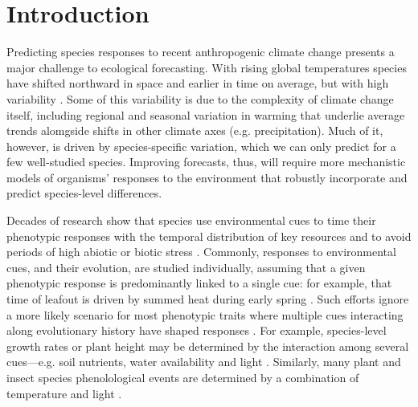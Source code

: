 \documentclass{article}\usepackage[]{graphicx}\usepackage[]{color}
\begin{document}
\section*{Introduction}
Predicting species responses to recent anthropogenic climate change presents a major challenge to ecological forecasting. With rising global temperatures species have shifted northward in space and earlier in time on average, but with high variability \citep{IPCC:2014sm}. Some of this variability is due to the complexity of climate change itself, including regional and seasonal variation in warming that underlie average trends alomgside shifts in other climate axes (e.g. precipitation). Much of it, however, is driven by species-specific variation, which we can only predict for a few well-studied species. Improving forecasts, thus, will require more mechanistic models of organisms' responses to the environment that robustly incorporate and predict species-level differences. %

Decades of research show that species use environmental cues to time their phenotypic responses with the temporal distribution of key resources and to avoid periods of high abiotic or biotic stress \citep{larcher1980,bonamour2019}. Commonly, responses to environmental cues, and their evolution, are studied individually, assuming that a given phenotypic response is predominantly linked to a single cue: for example, that time of leafout is driven by summed heat during early spring \citep[e.g.,][]{davies2013phylogenetic}. Such efforts ignore a more likely scenario for most phenotypic traits where multiple cues interacting along evolutionary history have shaped responses \citep{Ackerly:2009ly}. For example, species-level growth rates or plant height may be determined by the interaction among several cues---e.g. soil nutrients, water availability and light \citep{larcher1980}. Similarly, many plant and insect species phenolological events are determined by a combination of temperature and light \citep{chuinearees}.
\end{document}
